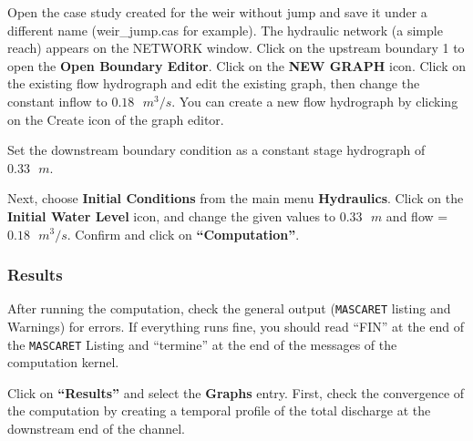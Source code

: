 \documentclass[a4paper,12pt]{article}
\begin{document}
\hspace{0.5cm} Open the case study created for the weir without jump and save it
under a different name (weir\_jump.cas for example). The hydraulic
network (a simple reach) appears on the NETWORK window. Click on the
upstream boundary 1 to open the \textbf{Open Boundary Editor}.
Click on the \textbf{NEW GRAPH} icon. Click on the existing flow hydrograph and edit the existing
graph, then change the constant inflow to $0.18\mbox{ }m^3/s$. You can create a new flow hydrograph by clicking on the Create icon of
the graph editor.

\vspace{0.5cm}

Set the downstream boundary condition as a constant stage hydrograph of $0.33\mbox{ }m$.

\vspace{0.5cm}

Next, choose \textbf{Initial Conditions} from the main menu \textbf{Hydraulics}. Click on the \textbf{Initial
Water Level} icon, and change the given values to $0.33\mbox{ }m$ and flow = $0.18\mbox{ }m^3/s$. Confirm and click on
\textbf{{}``Computation''}.


\subsubsection{Results}

\hspace{0.5cm} After running the computation, check the general output (\texttt{MASCARET}
listing and Warnings) for errors. If everything runs fine, you should
read {}``FIN'' at the end of the \texttt{MASCARET} Listing and {}``termine''
at the end of the messages of the computation kernel.

\vspace{0.5cm}

Click on \textbf{{}``Results''} and select the
\textbf{Graphs} entry. First, check the convergence of the computation
by creating a temporal profile of the total discharge at the downstream end of the channel. 

\vspace{0.5cm}
\end{document}
